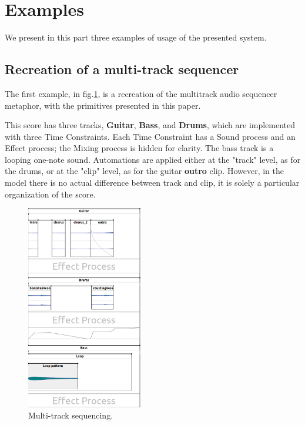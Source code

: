 \documentclass{article}
\begin{document}



\section{Examples}
We present in this part three examples of usage of the presented system.

\subsection{Recreation of a multi-track sequencer}
The first example, in fig.\ref{fig.score1}, is a recreation of the multitrack audio sequencer metaphor, with the primitives presented in this paper.
 
This score has three tracks, \textbf{Guitar}, \textbf{Bass}, and \textbf{Drums}, which are implemented with three Time Constraints.
Each Time Constraint has a Sound process and an Effect process; the Mixing process is hidden for clarity.
The bass track is a looping one-note sound. Automations are applied either at the "track" level, as for the drums, or at the "clip" level, as for the guitar \textbf{outro} clip. 
However, in the model there is no actual difference between track and clip, it is solely a particular organization of the score.
 
\begin{figure}[h]
    \centering
    \includegraphics[width=0.45\textwidth]{figures/ex1.png}
    \caption{Multi-track sequencing.}
    \label{fig.score1}
\end{figure}
\end{document}
